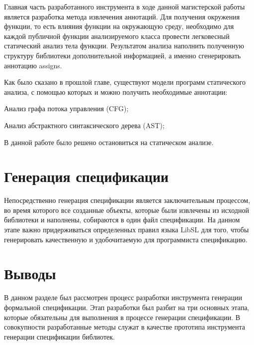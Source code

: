 Главная часть разработанного инструмента в ходе данной магистерской работы является разработка метода извлечения аннотаций.
Для получения окружения функции, то есть влияния функции на окружающую среду, необходимо для каждой публичной функции анализируемого класса провести легковесный статический анализ тела функции.
Результатом анализа наполнить полученную структуру библиотеки дополнительной информацией, а именно сгенерировать аннотацию assigns.

Как было сказано в прошлой главе, существуют модели программ статического анализа, с помощью которых и можно получить необходимые аннотации:
%
\begin{itemize*}
\item Анализ графа потока управления (CFG);
\item Анализ абстрактного синтаксического дерева (AST);
\end{itemize*}
%

В данной работе было решено остановиться на статическом анализе.

\section{Генерация спецификации}

Непосредственно генерация спецификации является заключительным процессом, во время которого все созданные объекты, которые были извлечены из исходной библиотеки и наполнены, собираются в один файл спецификации.
На данном этапе важно придерживаться определенных правил языка LibSL для того, чтобы генерировать качественную и удобочитаемую для программиста спецификацию.

\section{Выводы}

В данном разделе был рассмотрен процесс разработки инструмента генерации формальной спецификации. Этап разработки был разбит на три основных этапа, которые обязательны для выполнения в процессе генерации спецификации.
В совокупности разработанные методы служат в качестве прототипа инструмента генерации спецификации библиотек.